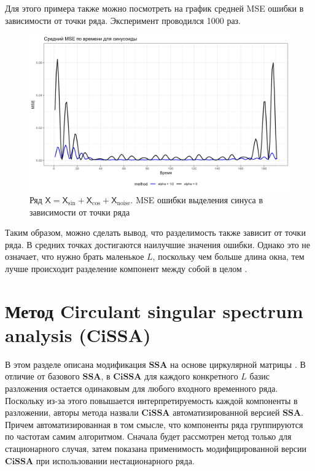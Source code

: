 \documentclass[a4paper, 11pt]{article}
\newcommand{\SSA}{\textbf{SSA}}
\newcommand{\CISSA}{\textbf{CiSSA}}
\newcommand{\TS}{\mathsf{X}}
\begin{document}
Для этого примера также можно посмотреть на график средней MSE ошибки в зависимости от точки ряда. Эксперимент проводился 1000 раз.
\begin{figure}[H]
	\centering
	\includegraphics[width=1\textwidth]{img/mse_y1_time.png}
	\caption{Ряд $\TS = \TS_{\sin} + \TS_{\cos}+ \TS_{\mathrm{noise}}$. MSE ошибки выделения синуса в зависимости от точки ряда}
	\label{fig:mse_filter_point_depends}
\end{figure}

Таким образом, можно сделать вывод, что разделимость также зависит от точки ряда. В средних точках достигаются наилучшие значения ошибки. Однако это не означает, что нужно брать маленькое $L$, поскольку чем больше длина окна, тем лучше происходит разделение компонент между собой в целом \cite{golyandina2001analysis}.


\newpage






\section{Метод Circulant singular spectrum analysis (CiSSA)}
\label{sec:cissa}


В этом разделе описана модификация $\SSA$ на основе циркулярной матрицы \cite{bogalo2020}. В отличие от базового $\SSA$, в $\CISSA$ для каждого конкретного $L$ базис разложения остается одинаковым для любого входного временного ряда. Поскольку из-за этого повышается интерпретируемость каждой компоненты в разложении, авторы метода назвали $\CISSA$ автоматизированной версией $\SSA$. Причем автоматизированная в том смысле, что компоненты ряда группируются по частотам самим алгоритмом. Сначала будет рассмотрен метод только для стационарного случая, затем показана применимость модифицированной версии $\CISSA$ при использовании нестационарного ряда.
\end{document}
